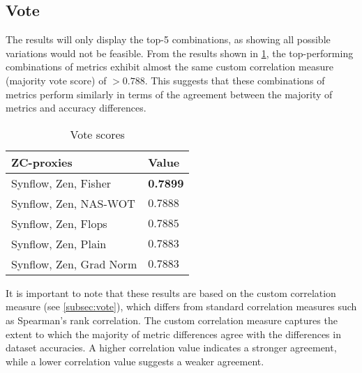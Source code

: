 
\subsection{Vote}\label{subsec:r_vote}

The results will only display the top-5 combinations, as showing all possible variations would not be feasible. From the results shown in \cref{tab:vote}, the top-performing combinations of metrics exhibit almost the same custom correlation measure (majority vote score) of $ > 0.788$. This suggests that these combinations of metrics perform similarly in terms of the agreement between the majority of metrics and accuracy differences.

\begin{table}[h!]
\caption{Vote scores}
\centering
\begin{tabular}{ll}
\textbf{ZC-proxies} & \textbf{Value} \\ \hline
\multicolumn{1}{l|}{Synflow, Zen, Fisher} & \textbf{0.7899} \\
\multicolumn{1}{l|}{\cellcolor{verylightgray}Synflow, Zen, NAS-WOT} & \cellcolor{verylightgray}$0.7888$ \\
\multicolumn{1}{l|}{Synflow, Zen, Flops} & $0.7885$ \\
\multicolumn{1}{l|}{\cellcolor{verylightgray}Synflow, Zen, Plain} & \cellcolor{verylightgray}$0.7883$ \\
\multicolumn{1}{l|}{Synflow, Zen, Grad Norm} & $0.7883$ \\
\end{tabular}
\label{tab:vote}
\end{table}

It is important to note that these results are based on the custom correlation measure (see \cref{subsec:vote}), which differs from standard correlation measures such as Spearman's rank correlation. The custom correlation measure captures the extent to which the majority of metric differences agree with the differences in dataset accuracies. A higher correlation value indicates a stronger agreement, while a lower correlation value suggests a weaker agreement.
